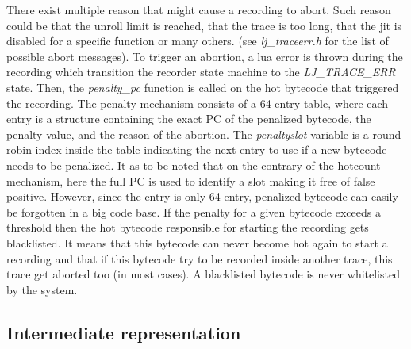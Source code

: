 There exist multiple reason that might cause a recording to abort. Such reason
could be that the unroll limit is reached, that the trace is too long, that the
jit is disabled for a specific function or many others. (see \emph{lj\_traceerr.h}
for the list of possible abort messages). To trigger an abortion, a lua error is
thrown during the recording which transition the recorder state machine to the
\emph{LJ\_TRACE\_ERR} state. Then, the \emph{penalty\_pc} function is called on
the hot bytecode that triggered the recording. The penalty mechanism consists of
a 64-entry table, where each entry is a structure containing the exact PC of the
penalized bytecode, the penalty value, and the reason of the abortion. The
\emph{penaltyslot} variable is a round-robin index inside the table indicating
the next entry to use if a new bytecode needs to be penalized. It as to be noted
that on the contrary of the hotcount mechanism, here the full PC is used to
identify a slot making it free of false positive. However, since the entry is
only 64 entry, penalized bytecode can easily be forgotten in a big code base.
If the penalty for a given bytecode exceeds a threshold then the hot bytecode
responsible for starting the recording gets blacklisted. It means that this
bytecode can never become hot again to start a recording and that if this
bytecode try to be recorded inside another trace, this trace get aborted too
(in most cases). A blacklisted bytecode is never whitelisted by the system.


\subsection{Intermediate representation}
\label{Subsec:IR}

